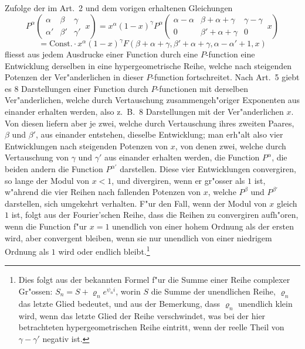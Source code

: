 \documentclass[12pt,a4paper]{article}
\begin{document}
Zufolge der im Art.~2 und dem vorigen erhaltenen Gleichungen
\[
P^{\alpha} \left(\begin{array}{ccc|} \alpha & \beta & \gamma \\ \alpha' & \beta' & \gamma' \end{array}\, x\right) = x^{\alpha} (1 - x)^{\gamma} P^{\alpha} \left(\begin{array}{ccc|} \alpha - \alpha & \beta + \alpha + \gamma & \gamma - \gamma \\ 0 & \beta' + \alpha + \gamma & 0 \end{array}\, x\right)
\]
\[
= \text{Const.} \cdot x^{\alpha} (1 - x)^{\gamma} F(\beta + \alpha + \gamma, \beta' + \alpha + \gamma, \alpha - \alpha' + 1, x)
\]
fliesst aus jedem Ausdrucke einer Function durch eine $P$-function eine Entwicklung derselben in eine hypergeometrische Reihe, welche nach steigenden Potenzen der Ver{"a}nderlichen in dieser $P$-function fortschreitet. Nach Art.~5 giebt es 8 Darstellungen einer Function durch $P$-functionen mit derselben Ver{"a}nderlichen, welche durch Vertauschung zusammengeh{"o}riger Exponenten aus einander erhalten werden, also z.~B.\ 8 Darstellungen mit der Ver{"a}nderlichen $x$. Von diesen liefern aber je zwei, welche durch Vertauschung ihres zweiten Paares, $\beta$ und $\beta'$, aus einander entstehen, dieselbe Entwicklung; man erh{"a}lt also vier Entwicklungen nach steigenden Potenzen von $x$, von denen zwei, welche durch Vertauschung von $\gamma$ und $\gamma'$ aus einander erhalten werden, die Function $P^{\alpha}$, die beiden andern die Function $P^{\alpha'}$ darstellen. Diese vier Entwicklungen convergiren, so lange der Modul von $x < 1$, und divergiren, wenn er gr{"o}sser als $1$ ist, w{"a}hrend die vier Reihen nach fallenden Potenzen von $x$, welche $P^{\beta}$ und $P^{\beta'}$ darstellen, sich umgekehrt verhalten. F{"u}r den Fall, wenn der Modul von $x$ gleich $1$ ist, folgt aus der Fourier'schen Reihe, dass die Reihen zu convergiren aufh{"o}ren, wenn die Function f{"u}r $x = 1$ unendlich von einer hohem Ordnung als der ersten wird, aber convergent bleiben, wenn sie nur unendlich von einer niedrigem Ordnung als $1$ wird oder endlich bleibt.\footnote{Dies folgt aus der bekannten Formel f{"u}r die Summe einer Reihe complexer Gr{"o}ssen: $S_n = S + \varrho_n e^{\psi_n i}$, worin $S$ die Summe der unendlichen Reihe, $\varrho_n$ das letzte Glied bedeutet, und aus der Bemerkung, dass $\varrho_n$ unendlich klein wird, wenn das letzte Glied der Reihe verschwindet, was bei der hier betrachteten hypergeometrischen Reihe eintritt, wenn der reelle Theil von $\gamma - \gamma'$ negativ ist.}
\end{document}
